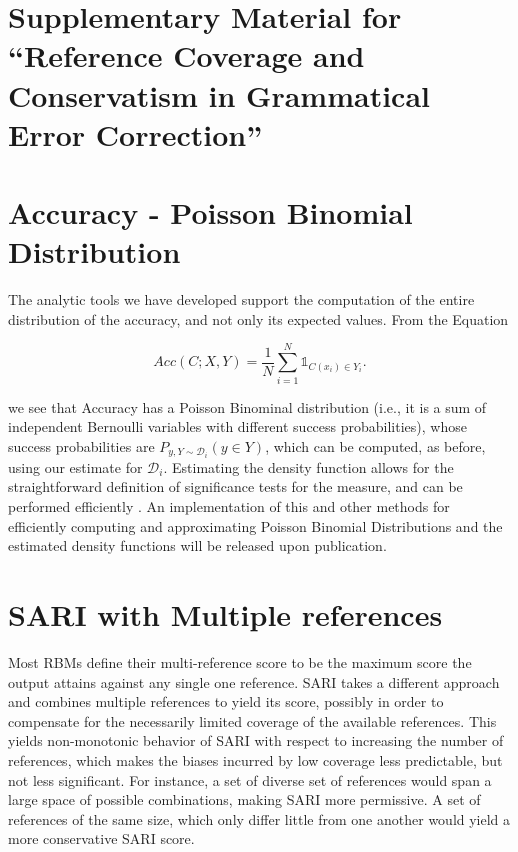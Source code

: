 \documentclass[letterpaper, 11pt]{article}
\newenvironment{myequation}{
  \vspace{-1em}
 \begin{equation}
}{
 \end{equation}
 \vspace{-1.2em}
}
\begin{document}
\appendix

\title{}

\onecolumn
\section*{\centering\Large Supplementary Material for ``Reference Coverage and Conservatism in Grammatical Error Correction''}
\section{Accuracy - Poisson Binomial Distribution}\label{ap:poibin}
The analytic tools we have developed support the computation of the entire distribution of the accuracy, and not only its expected values. From the Equation 
	
	\begin{myequation}\label{eq:acc_def}
		Acc\left(C;X,Y\right) = \frac{1}{N} \sum_{i=1}^N \mathds{1}_{C(x_i) \in Y_i}.
	\end{myequation}
	
\noindent
 we see that Accuracy has a Poisson Binominal distribution (i.e., it is a sum of independent Bernoulli variables with different success probabilities), whose success probabilities are $P_{y,Y \sim \mathcal{D}_i}(y \in Y)$, which can be computed, as before, using our estimate for $\mathcal{D}_i$. Estimating the density function allows for the straightforward definition of significance tests for the measure, and can be performed efficiently \cite{hong2013computing}. An implementation of this and other methods for efficiently computing and approximating Poisson Binomial Distributions and the estimated density functions will be released upon publication.

\section{SARI with Multiple references}\label{ap:sari-assum}
Most RBMs define their multi-reference score to be the maximum score the
output attains against any single one reference.
SARI takes a different approach and combines multiple references to yield its score, 
possibly in order to compensate for the necessarily limited coverage of the available
references. This yields non-monotonic behavior of SARI with respect to increasing
the number of references, which makes the biases incurred by low coverage less predictable,
but not less significant.
For instance, a set of diverse set of references would span a large space of possible
combinations, making SARI more permissive. A set of references of the same size, which only differ little
from one another would yield a more conservative SARI score.
\end{document}
